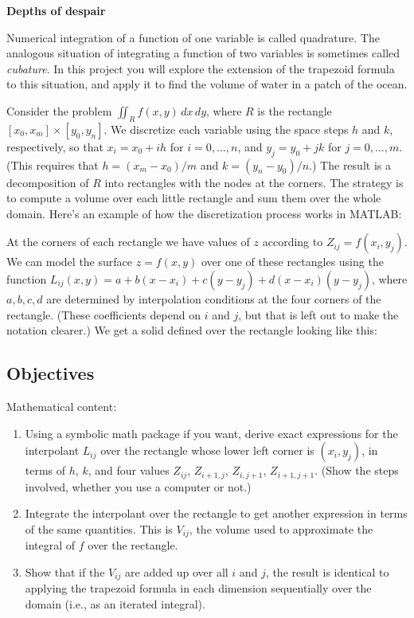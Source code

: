 \documentclass[11pt,twoside]{article}
\begin{document}
\begin{center}
  \bf Depths of despair
\end{center}

Numerical integration of a function of one variable is called quadrature. The analogous situation of integrating a function of two variables is sometimes called \emph{cubature}. In this project you will explore the extension of the trapezoid formula to this situation, and apply it to find the volume of water in a patch of the ocean.

Consider the problem $\iint_R f(x,y)\,dx\,dy$, where $R$ is the rectangle $[x_0,x_m] \times [y_0,y_n]$. We discretize each variable using the space steps $h$ and $k$, respectively, so that $x_i = x_0 + ih$ for $i=0,\ldots,n$, and $y_j=y_0+jk$ for $j=0,\ldots,m$. (This requires that $h=(x_m-x_0)/m$ and $k=(y_n-y_0)/n$.) The result is a decomposition of $R$ into rectangles with the nodes at the corners. The strategy is to compute a volume over each little rectangle and sum them over the whole domain. Here's an example of how the discretization process works in MATLAB:



At the corners of each rectangle we have values of $z$ according to $Z_{ij}=f(x_i,y_j)$. We can model the surface $z=f(x,y)$ over one of these rectangles using the function $L_{ij}(x,y)=a + b (x-x_i) + c(y-y_j) + d(x-x_i)(y-y_j)$, where $a,b,c,d$ are determined by interpolation conditions at the four corners of the rectangle. (These coefficients depend on $i$ and $j$, but that is left out to make the notation clearer.) We get a solid defined over the rectangle looking like this:




\subsection*{Objectives}
\label{sec:objectives}

Mathematical content:
\begin{enumerate}
\item Using a symbolic math package if you want, derive exact expressions for the interpolant $L_{ij}$ over the rectangle whose lower left corner is $(x_i,y_j)$, in terms of $h$, $k$, and four values $Z_{ij}$, $Z_{i+1,j}$, $Z_{i,j+1}$, $Z_{i+1,j+1}$. (Show the steps involved, whether you use a computer or not.)  
\item Integrate the interpolant over the rectangle to get another expression in terms of the same quantities. This is $V_{ij}$, the volume used to approximate the integral of $f$ over the rectangle. 
\item Show that if the $V_{ij}$ are added up over all $i$ and $j$, the result is identical to applying the trapezoid formula in each dimension sequentially over the domain (i.e., as an iterated integral). 
\end{enumerate}
\end{document}
